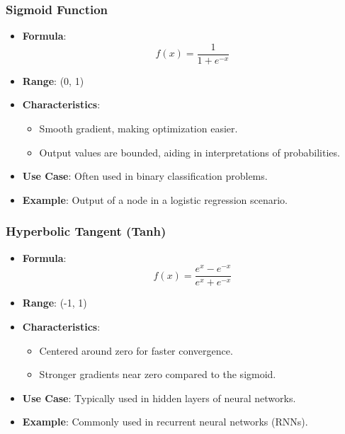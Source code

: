 \documentclass[aspectratio=169]{beamer}
\begin{document}
\begin{frame}[fragile]
    \frametitle{Sigmoid Function}
    \begin{itemize}
        \item \textbf{Formula}: 
        \begin{equation}
        f(x) = \frac{1}{1 + e^{-x}}
        \end{equation}
        \item \textbf{Range}: (0, 1)
        \item \textbf{Characteristics}:
        \begin{itemize}
            \item Smooth gradient, making optimization easier.
            \item Output values are bounded, aiding in interpretations of probabilities.
        \end{itemize}
        \item \textbf{Use Case}: Often used in binary classification problems.
        \item \textbf{Example}: Output of a node in a logistic regression scenario.
    \end{itemize}
\end{frame}

\begin{frame}[fragile]
    \frametitle{Hyperbolic Tangent (Tanh)}
    \begin{itemize}
        \item \textbf{Formula}: 
        \begin{equation}
        f(x) = \frac{e^x - e^{-x}}{e^x + e^{-x}}
        \end{equation}
        \item \textbf{Range}: (-1, 1)
        \item \textbf{Characteristics}:
        \begin{itemize}
            \item Centered around zero for faster convergence.
            \item Stronger gradients near zero compared to the sigmoid.
        \end{itemize}
        \item \textbf{Use Case}: Typically used in hidden layers of neural networks.
        \item \textbf{Example}: Commonly used in recurrent neural networks (RNNs).
    \end{itemize}
\end{frame}
\end{document}
